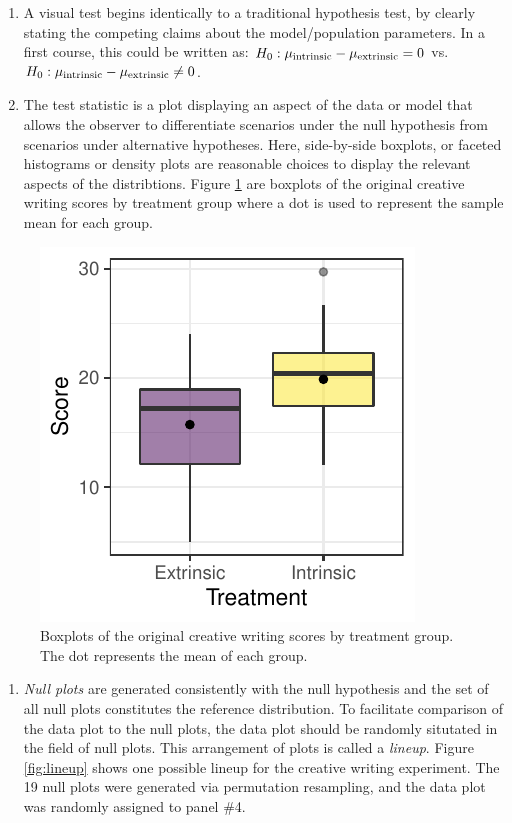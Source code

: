 \documentclass[12pt]{article}
\providecommand{\tightlist}{%
  \setlength{\itemsep}{0pt}\setlength{\parskip}{0pt}}
\begin{document}
\begin{enumerate}
\def\labelenumi{\arabic{enumi}.}
\item
  A visual test begins identically to a traditional hypothesis test, by
  clearly stating the competing claims about the model/population
  parameters. In a first course, this could be written as:
  \(H_0: \mu_{\rm intrinsic} - \mu_{\rm extrinsic} = 0\) vs.
  \(H_0: \mu_{\rm intrinsic} - \mu_{\rm extrinsic} \ne 0\).
\item
  The test statistic is a plot displaying an aspect of the data or model
  that allows the observer to differentiate scenarios under the null
  hypothesis from scenarios under alternative hypotheses. Here,
  side-by-side boxplots, or faceted histograms or density plots are
  reasonable choices to display the relevant aspects of the
  distribtions. Figure \ref{fig:data_plot} are boxplots of the original
  creative writing scores by treatment group where a dot is used to
  represent the sample mean for each group.
\end{enumerate}

\begin{figure}
\centering
\includegraphics{figs/diff_means_plot.pdf}
\caption{\label{fig:data_plot} Boxplots of the original creative writing
scores by treatment group. The dot represents the mean of each group.}
\end{figure}

\begin{enumerate}
\def\labelenumi{\arabic{enumi}.}
\setcounter{enumi}{2}
\tightlist
\item
  \emph{Null plots} are generated consistently with the null hypothesis
  and the set of all null plots constitutes the reference distribution.
  To facilitate comparison of the data plot to the null plots, the data
  plot should be randomly situtated in the field of null plots. This
  arrangement of plots is called a \emph{lineup}. Figure
  \ref{fig:lineup} shows one possible lineup for the creative writing
  experiment. The 19 null plots were generated via permutation
  resampling, and the data plot was randomly assigned to panel \#4.
\end{enumerate}
\end{document}
